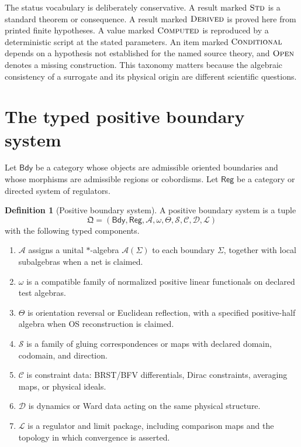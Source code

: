 \documentclass[11pt,a4paper]{article}
\theoremstyle{definition}
\newtheorem{definition}[theorem]{Definition}
\theoremstyle{remark}
\newcommand{\A}{\mathcal A}
\newcommand{\status}[1]{\textsc{#1}}
\newcommand{\Bdy}{\mathsf{Bdy}}
\newcommand{\Reg}{\mathsf{Reg}}
\begin{document}
The status vocabulary is deliberately conservative.  A result marked
$\status{Std}$ is a standard theorem or consequence.  A result marked
$\status{Derived}$ is proved here from printed finite hypotheses.  A value marked
$\status{Computed}$ is reproduced by a deterministic script at the stated parameters.
An item marked $\status{Conditional}$ depends on a hypothesis not established for the
named source theory, and $\status{Open}$ denotes a missing construction.  This
taxonomy matters because the algebraic consistency of a surrogate and its physical
origin are different scientific questions.

\section{The typed positive boundary system}

Let $\Bdy$ be a category whose objects are admissible oriented boundaries and
whose morphisms are admissible regions or cobordisms.  Let $\Reg$ be a category
or directed system of regulators.

\begin{definition}[Positive boundary system]
A positive boundary system is a tuple
\begin{equation}
  \mathfrak Q=(\Bdy,\Reg,\A,\omega,\Theta,\mathcal S,
  \mathcal C,\mathcal D,\mathcal L)
  \label{eq:system}
\end{equation}
with the following typed components.
\begin{enumerate}[label=(\roman*)]
 \item $\A$ assigns a unital $*$-algebra $\A(\Sigma)$ to each boundary
 $\Sigma$, together with local subalgebras when a net is claimed.
 \item $\omega$ is a compatible family of normalized positive linear
 functionals on declared test algebras.
 \item $\Theta$ is orientation reversal or Euclidean reflection, with a
 specified positive-half algebra when OS reconstruction is claimed.
 \item $\mathcal S$ is a family of gluing correspondences or maps with declared
 domain, codomain, and direction.
 \item $\mathcal C$ is constraint data: BRST/BFV differentials, Dirac
 constraints, averaging maps, or physical ideals.
 \item $\mathcal D$ is dynamics or Ward data acting on the same physical
 structure.
 \item $\mathcal L$ is a regulator and limit package, including comparison maps
 and the topology in which convergence is asserted.
\end{enumerate}
\end{definition}
\end{document}
